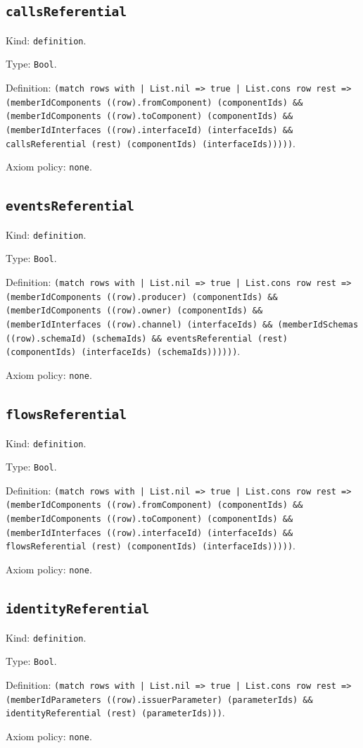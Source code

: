 \documentclass[11pt]{article}
\begin{document}
\subsection*{\texttt{callsReferential}}
\noindent Kind: \texttt{definition}.\par
\noindent Type: \texttt{Bool}.\par
\noindent Definition: \texttt{(match rows with | List.nil => true | List.cons row rest => (memberIdComponents ((row).fromComponent) (componentIds) \&\& (memberIdComponents ((row).toComponent) (componentIds) \&\& (memberIdInterfaces ((row).interfaceId) (interfaceIds) \&\& callsReferential (rest) (componentIds) (interfaceIds)))))}.\par
\noindent Axiom policy: \texttt{none}.\par
\subsection*{\texttt{eventsReferential}}
\noindent Kind: \texttt{definition}.\par
\noindent Type: \texttt{Bool}.\par
\noindent Definition: \texttt{(match rows with | List.nil => true | List.cons row rest => (memberIdComponents ((row).producer) (componentIds) \&\& (memberIdComponents ((row).owner) (componentIds) \&\& (memberIdInterfaces ((row).channel) (interfaceIds) \&\& (memberIdSchemas ((row).schemaId) (schemaIds) \&\& eventsReferential (rest) (componentIds) (interfaceIds) (schemaIds))))))}.\par
\noindent Axiom policy: \texttt{none}.\par
\subsection*{\texttt{flowsReferential}}
\noindent Kind: \texttt{definition}.\par
\noindent Type: \texttt{Bool}.\par
\noindent Definition: \texttt{(match rows with | List.nil => true | List.cons row rest => (memberIdComponents ((row).fromComponent) (componentIds) \&\& (memberIdComponents ((row).toComponent) (componentIds) \&\& (memberIdInterfaces ((row).interfaceId) (interfaceIds) \&\& flowsReferential (rest) (componentIds) (interfaceIds)))))}.\par
\noindent Axiom policy: \texttt{none}.\par
\subsection*{\texttt{identityReferential}}
\noindent Kind: \texttt{definition}.\par
\noindent Type: \texttt{Bool}.\par
\noindent Definition: \texttt{(match rows with | List.nil => true | List.cons row rest => (memberIdParameters ((row).issuerParameter) (parameterIds) \&\& identityReferential (rest) (parameterIds)))}.\par
\noindent Axiom policy: \texttt{none}.\par
\end{document}
